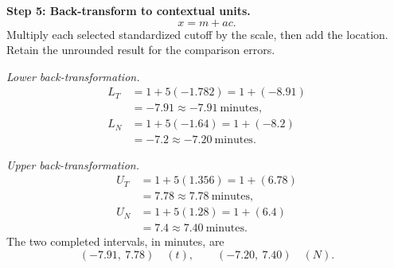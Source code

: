 \begin{enumerate}[leftmargin=*,label=\textbf{\arabic*.},itemsep=12pt,parsep=3pt,topsep=5pt]
\par\noindent\begin{minipage}{\linewidth}
\par\textbf{Step 5: Back-transform to contextual units.}\nopagebreak\enspace \[
x=m+ac.
\]
Multiply each selected standardized cutoff by the scale, then add the location. Retain the unrounded result for the comparison errors.
\par\textit{Lower back-transformation.}
\[
\begin{aligned}L_T&=1+5(-1.782)=1+(-8.91)\\&=-7.91\approx\boxed{-7.91\ \text{minutes}},\\L_N&=1+5(-1.64)=1+(-8.2)\\&=-7.2\approx\boxed{-7.20\ \text{minutes}}.\end{aligned}
\]
\par\textit{Upper back-transformation.}
\[
\begin{aligned}U_T&=1+5(1.356)=1+(6.78)\\&=7.78\approx\boxed{7.78\ \text{minutes}},\\U_N&=1+5(1.28)=1+(6.4)\\&=7.4\approx\boxed{7.40\ \text{minutes}}.\end{aligned}
\]
The two completed intervals, in minutes, are
\[
\boxed{(-7.91,\ 7.78)\quad(t)},\qquad\boxed{(-7.20,\ 7.40)\quad(N)}.
\]


\end{minipage}
\end{enumerate}
